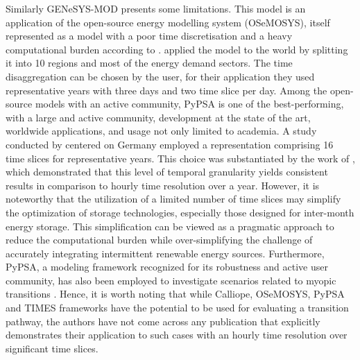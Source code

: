 Similarly GENeSYS-MOD presents some limitations. This model is an application of the open-source energy modelling system (OSeMOSYS), itself represented as a model with a poor time discretisation and a heavy computational burden according to 
\cite{prina2019transition}. \citet{loffler2017designing} applied the model to the world by splitting it into 10 regions and most of the energy demand sectors. The time disaggregation can be chosen by the user, for their application they used representative years with three days and two time slice per day. 
Among the open-source models with an active community, PyPSA is one of the best-performing, with a large and active community, development at the state of the art, worldwide applications, and usage not only limited to academia. A study conducted by \citet{bartholdsen2019pathways} centered on Germany employed a representation comprising 16 time slices for representative years. This choice was substantiated by the work of \citet{welsch2014incorporating}, which demonstrated that this level of temporal granularity yields consistent results in comparison to hourly time resolution over a year. However, it is noteworthy that the utilization of a limited number of time slices may simplify the optimization of storage technologies, especially those designed for inter-month energy storage. This simplification can be viewed as a pragmatic approach to reduce the computational burden while over-simplifying the challenge of accurately integrating intermittent renewable energy sources. Furthermore, PyPSA, a modeling framework recognized for its robustness and active user community, has also been employed to investigate scenarios related to myopic transitions \cite{pedersen2022long}. 
Hence, it is worth noting that while Calliope, OSeMOSYS, PyPSA and TIMES frameworks have the potential to be used for evaluating a transition pathway, the authors have not come across any publication that explicitly demonstrates their application to such cases with an hourly time resolution over significant time slices. 



